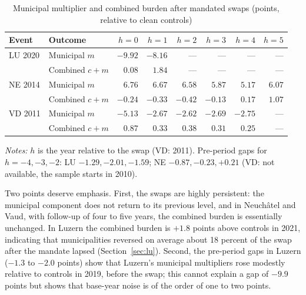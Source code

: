\documentclass[11pt,a4paper]{article}
\begin{document}
\begin{table}[t]\centering\small
\begin{threeparttable}
\caption{Municipal multiplier and combined burden after mandated swaps (points, relative to clean controls)}\label{tab:swapes}
\begin{tabular}{llrrrrrr}
\toprule
Event & Outcome & $h=0$ & $h=1$ & $h=2$ & $h=3$ & $h=4$ & $h=5$ \\
\midrule
LU 2020 & Municipal $m$ & $-9.92$ & $-8.16$ & --- & --- & --- & --- \\
        & Combined $c+m$ & $0.08$ & $1.84$ & --- & --- & --- & --- \\
NE 2014 & Municipal $m$ & $6.76$ & $6.67$ & $6.58$ & $5.87$ & $5.17$ & $6.07$ \\
        & Combined $c+m$ & $-0.24$ & $-0.33$ & $-0.42$ & $-0.13$ & $0.17$ & $1.07$ \\
VD 2011 & Municipal $m$ & $-5.13$ & $-2.67$ & $-2.62$ & $-2.69$ & $-2.75$ & --- \\
        & Combined $c+m$ & $0.87$ & $0.33$ & $0.38$ & $0.31$ & $0.25$ & --- \\
\bottomrule
\end{tabular}

\begin{tablenotes}\footnotesize
\item \emph{Notes:} $h$ is the year relative to the swap (VD: 2011). Pre-period gaps for $h=-4,-3,-2$: LU $-1.29,-2.01,-1.59$; NE $-0.87,-0.23,+0.21$ (VD: not available, the sample starts in 2010).
\end{tablenotes}
\end{threeparttable}
\end{table}

\FloatBarrier

Two points deserve emphasis. First, the swaps are highly persistent: the municipal component does not return to its previous level, and in Neuch\^atel and Vaud, with follow-up of four to five years, the combined burden is essentially unchanged. In Luzern the combined burden is $+1.8$ points above controls in 2021, indicating that municipalities reversed on average about 18 percent of the swap after the mandate lapsed (Section~\ref{sec:lu}). Second, the pre-period gaps in Luzern ($-1.3$ to $-2.0$ points) show that Luzern's municipal multipliers rose modestly relative to controls in 2019, before the swap; this cannot explain a gap of $-9.9$ points but shows that base-year noise is of the order of one to two points.
\end{document}
